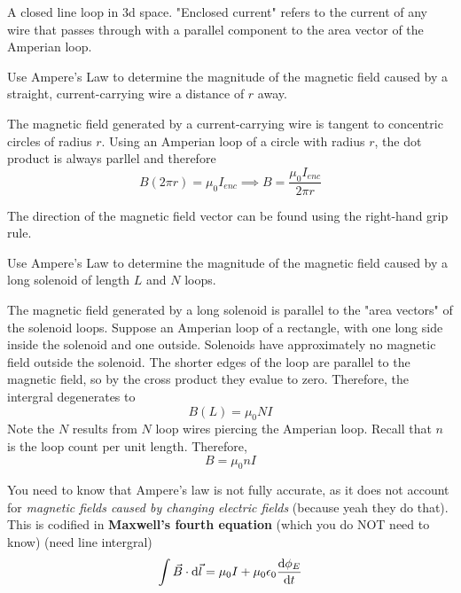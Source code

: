 \documentclass{article}
\begin{document}
\begin{definition}
    A closed line loop in 3d space.
    "Enclosed current" refers to the current of any wire that passes through with a parallel component to the area vector of the Amperian loop.
\end{definition}

\begin{example}
    Use Ampere's Law to determine the magnitude of the magnetic field caused by a straight, current-carrying wire a distance of $r$ away.
\end{example}
\begin{answer}
    The magnetic field generated by a current-carrying wire is tangent to concentric circles of radius $r$.
    Using an Amperian loop of a circle with radius $r$, the dot product is always parllel and therefore
    \[B (2 \pi r) = \mu_0 I_{enc} \implies B = \frac{\mu_0 I_{enc}}{2 \pi r}\]

    The direction of the magnetic field vector can be found using the right-hand grip rule.
\end{answer}

\begin{example}
    Use Ampere's Law to determine the magnitude of the magnetic field caused by a long solenoid of length $L$ and $N$ loops.
\end{example}
\begin{answer}
    The magnetic field generated by a long solenoid is parallel to the "area vectors" of the solenoid loops.
    Suppose an Amperian loop of a rectangle, with one long side inside the solenoid and one outside.
    Solenoids have approximately no magnetic field outside the solenoid.
    The shorter edges of the loop are parallel to the magnetic field, so by the cross product they evalue to zero.
    Therefore, the intergral degenerates to
    \[B(L) = \mu_0 N I\]
    Note the $N$ results from $N$ loop wires piercing the Amperian loop.
    Recall that $n$ is the loop count per unit length.
    Therefore, 
    \[\boxed{B = \mu_0 nI}\]
\end{answer}

You need to know that Ampere's law is not fully accurate, as it does not account for \textit{magnetic fields caused by changing electric fields} (because yeah they do that).
This is codified in \textbf{Maxwell's fourth equation} (which you do NOT need to know) (need line intergral)
\[\int \vec{B} \cdot \odif{\vec{l}} = \mu_0 I + \mu_0 \epsilon_0 \odv{\phi_E}{t}\]
\end{document}
